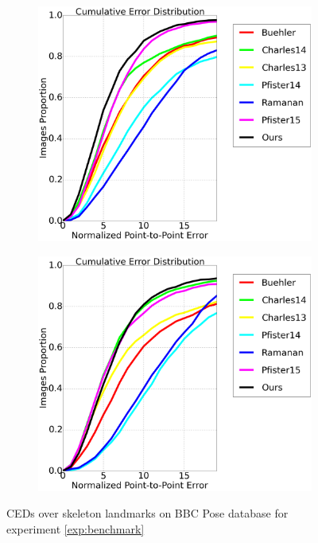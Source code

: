 \begin{figure}[b!]
    \centering
    \begin{subfigure}[b]{0.23\textwidth}
            \includegraphics[width=\textwidth]{resources/HandBenchmark/wrist}
    \end{subfigure}
    \hfill
    \begin{subfigure}[b]{0.23\textwidth}
            \includegraphics[width=\textwidth]{resources/HandBenchmark/elbow}
    \end{subfigure}
    \caption{CEDs over skeleton landmarks on BBC Pose database for experiment \ref{exp:benchmark}}
    \label{fig:hand_benchmark}
\end{figure}


